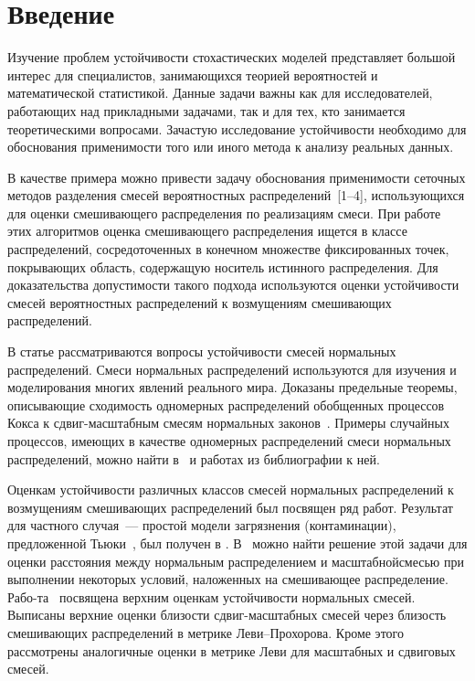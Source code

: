       \begin{multicols}{2}

            \label{st\stat}

\section{Введение}

Изучение проблем устойчивости стохастических моделей представляет
большой интерес для специалистов, занимающихся теорией вероятностей
и математической статистикой. Данные задачи важны  как для
исследователей, работающих над прикладными задачами, так и для тех,
кто занимается теоретическими вопросами. Зачастую исследование
устойчивости необходимо для обоснования применимости того или иного
метода к анализу реальных данных.

В качестве примера можно привести задачу обоснования применимости
сеточных методов разделения смесей вероятностных распределений~[1--4], 
использующихся для оценки смешивающего распределения по
реализациям смеси. При работе этих алгоритмов оценка смешивающего
распределения ищется в классе  распределений, сосредоточенных в
конечном множестве фиксированных точек, покрывающих область,
содержащую носитель истинного распределения. Для доказательства
допустимости такого подхода используются оценки устойчивости смесей
вероятностных распределений  к возмущениям смешивающих
распределений.

В статье рассматриваются вопросы устойчивости смесей нормальных
распределений. Смеси нормальных распределений используются для
изучения и моделирования многих явлений реального мира. Доказаны
предельные теоремы, описывающие сходимость одномерных распределений
обобщенных процессов Кокса к сдвиг-мас\-штаб\-ным смесям нормальных
законов~\cite{KorolevChaos}. Примеры случайных процессов, имеющих в
качестве одномерных распределений смеси нормальных распределений,
можно найти в~\cite{KorolevChaos} и работах из библиографии к ней.

Оценкам устойчивости различных классов смесей нормальных
распределений к возмущениям смешивающих распределений был посвящен
ряд работ. Результат для частного случая~--- простой модели
загрязнения (контаминации), предложенной Тьюки~\cite{Tukey_1960}, 
был получен в \cite{KorNazGridEng}. 
В~\cite{Hall1979357} можно найти решение этой задачи для оценки
расстояния между нормальным распределением и масштабной\linebreak \mbox{смесью} при
выполнении некоторых условий, наложенных на смешивающее
распределение. Рабо-\linebreak та~\cite{NazStab} посвящена верхним оценкам
\mbox{устойчивости} нормальных смесей. Выписаны верхние \mbox{оценки} близости
сдвиг-мас\-штаб\-ных смесей через близость смешивающих распределений в
метрике Ле\-ви--Про\-хо\-ро\-ва. Кроме этого рассмотрены аналогичные оценки
в мет\-ри\-ке Леви для масштабных и сдвиговых смесей.


\end{multicols}

